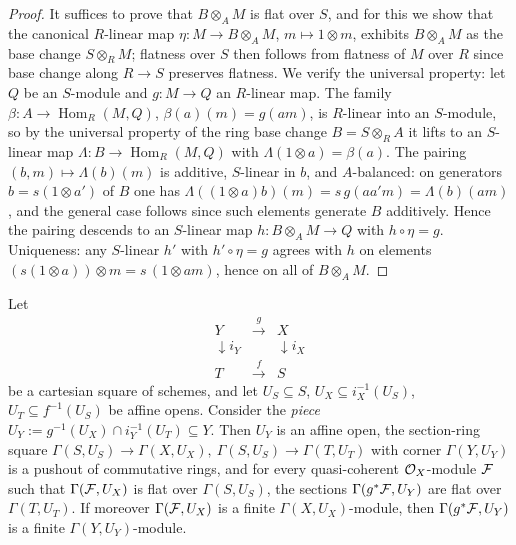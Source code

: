 \begin{proof}
  \leanok
  It suffices to prove that \(B \otimes_A M\) is flat over \(S\), and for
  this we show that the canonical \(R\)-linear map
  \(\eta : M \to B \otimes_A M\), \(m \mapsto 1 \otimes m\), exhibits
  \(B \otimes_A M\) as the base change \(S \otimes_R M\); flatness over
  \(S\) then follows from flatness of \(M\) over \(R\) since base change
  along \(R \to S\) preserves flatness.  We verify the universal property:
  let \(Q\) be an \(S\)-module and \(g : M \to Q\) an \(R\)-linear map.  The
  family \(\beta : A \to \operatorname{Hom}_R(M, Q)\),
  \(\beta(a)(m) = g(am)\), is \(R\)-linear into an \(S\)-module, so by the
  universal property of the ring base change \(B = S \otimes_R A\) it lifts
  to an \(S\)-linear map \(\Lambda : B \to \operatorname{Hom}_R(M, Q)\) with
  \(\Lambda(1 \otimes a) = \beta(a)\).  The pairing
  \((b, m) \mapsto \Lambda(b)(m)\) is additive, \(S\)-linear in \(b\), and
  \(A\)-balanced: on generators \(b = s (1 \otimes a')\) of \(B\) one has
  \(\Lambda((1 \otimes a) b)(m) = s\, g(a a' m) = \Lambda(b)(a m)\), and the
  general case follows since such elements generate \(B\) additively.  Hence
  the pairing descends to an \(S\)-linear map
  \(h : B \otimes_A M \to Q\) with \(h \circ \eta = g\).  Uniqueness: any
  \(S\)-linear \(h'\) with \(h' \circ \eta = g\) agrees with \(h\) on
  elements \((s(1 \otimes a)) \otimes m = s\,(1 \otimes am)\), hence on all
  of \(B \otimes_A M\).
\end{proof}

\begin{lemma}

\leanok
  \label{lem:flat_section_pullback_piece}
  Let
  \[
    \begin{array}{ccc}
      Y & \xrightarrow{\;g\;} & X \\
      \downarrow{\scriptstyle i_Y} & & \downarrow{\scriptstyle i_X} \\
      T & \xrightarrow{\;f\;} & S
    \end{array}
  \]
  be a cartesian square of schemes, and let \(U_S \subseteq S\),
  \(U_X \subseteq i_X^{-1}(U_S)\), \(U_T \subseteq f^{-1}(U_S)\) be affine
  opens.  Consider the \emph{piece}
  \(U_Y := g^{-1}(U_X) \cap i_Y^{-1}(U_T) \subseteq Y\).  Then \(U_Y\) is an
  affine open, the section-ring square
  \(\Gamma(S, U_S) \to \Gamma(X, U_X),\ \Gamma(S, U_S) \to \Gamma(T, U_T)\)
  with corner \(\Gamma(Y, U_Y)\) is a pushout of commutative rings, and for
  every quasi-coherent \(\mathcal{O}_X\)-module \(\mathcal{F}\) such that
  \(\Gamma(\mathcal{F}, U_X)\) is flat over \(\Gamma(S, U_S)\), the sections
  \(\Gamma(g^* \mathcal{F}, U_Y)\) are flat over \(\Gamma(T, U_T)\).  If moreover
  \(\Gamma(\mathcal{F}, U_X)\) is a finite \(\Gamma(X, U_X)\)-module, then
  \(\Gamma(g^* \mathcal{F}, U_Y)\) is a finite \(\Gamma(Y, U_Y)\)-module.
\end{lemma}

